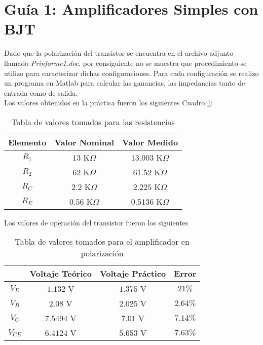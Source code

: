 \documentclass[11pt,graphicx,caption,rotating]{article}
\begin{document}
\section{Guía 1: Amplificadores Simples con BJT}
\noindent
Dado que la polarización del transistor se encuentra en el archivo adjunto llamado \textit{Prinforme1.doc}, por consiguiente no se muestra que procedimiento se utilizo para caracterizar dichas configuraciones. Para cada configuración se realizo un programa en Matlab para calcular las ganancias, las impedancias tanto de entrada como de salida.\\
Los valores obtenidos en la práctica fueron los siguientes Cuadro \ref{tab1}:
\begin{table}[H]
	\centering
\begin{tabular}[c]{|c||c|c|} \hline
Elemento & Valor Nominal & Valor Medido \\ \hline
$R_1$ & $13$ K$\Omega$ & $13.003$ K$\Omega$ \\ \hline
$R_2$ & $62$ K$\Omega$ & $61.52$ K$\Omega$ \\ \hline
$R_C$ & $2.2$ K$\Omega$ & $2.225$ K$\Omega$ \\ \hline
$R_E$ & $0.56$ K$\Omega$ & $0.5136$ K$\Omega$ \\ \hline
\end{tabular}
	\caption{Tabla de valores tomados para las resistencias}
	\label{tab1}
\end{table}
\noindent
Los valores de operación del transistor fueron los siguientes
\begin{table}[H]
	\centering
\begin{tabular}[c]{|c||c|c|c|} \hline
 & Voltaje Teórico & Voltaje Práctico & \textbf{Error} \\ \hline
$V_E$ & $1.132$ V & $1.375$ V & $21\%$ \\ \hline
$V_B$ & $2.08$ V & $2.025$ V & $2.64\%$ \\ \hline
$V_C$ & $7.5494$ V & $7.01$ V & $7.14\%$ \\ \hline
$V_{CE}$ & $6.4124$ V & $5.653$ V & $7.63\%$ \\ \hline
\end{tabular}
	\caption{Tabla de valores tomados para el amplificador en polarización}
	\label{tab2}
\end{table}
\end{document}
